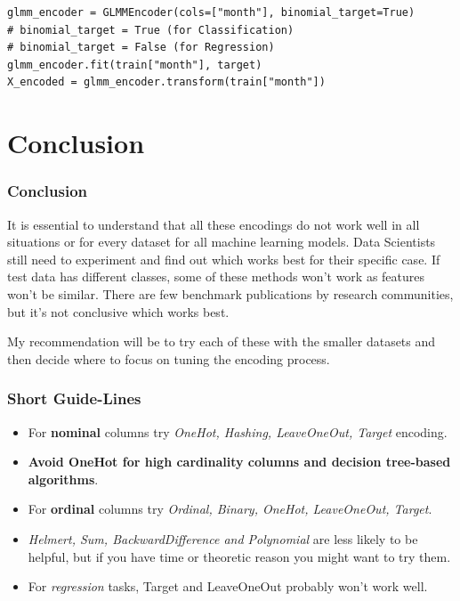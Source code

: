 \documentclass{beamer}
\begin{document}
    \begin{frame}[fragile]
        \begin{lstlisting}
glmm_encoder = GLMMEncoder(cols=["month"], binomial_target=True)
# binomial_target = True (for Classification)
# binomial_target = False (for Regression)
glmm_encoder.fit(train["month"], target)
X_encoded = glmm_encoder.transform(train["month"])
        \end{lstlisting}
    \end{frame}


    \section{Conclusion}
    \begin{frame}
        \frametitle{Conclusion}
        It is essential to understand that all these encodings do not work well in all situations
        or for every dataset for all machine learning models. Data Scientists still need to
        experiment and find out which works best for their specific case. If test data has
        different classes, some of these methods won't work as features won't be similar. There
        are few benchmark publications by research communities, but it's not conclusive which
        works best.

        My recommendation will be to try each of these with the smaller datasets and
        then decide where to focus on tuning the encoding process.
    \end{frame}

    \begin{frame}
        \frametitle{Short Guide-Lines}
        \begin{itemize}
            \item For \textbf{nominal} columns try \emph{OneHot, Hashing, LeaveOneOut, Target} encoding.
            \pause
            \item \textbf{Avoid OneHot for high cardinality columns and decision tree-based algorithms}.
            \pause
            \item For \textbf{ordinal} columns try \emph{Ordinal, Binary, OneHot, LeaveOneOut,
                Target}.
            \pause
            \item \emph{Helmert, Sum, BackwardDifference and Polynomial} are less likely to be
            helpful, but if you have time or theoretic reason you might want to try them.
            \pause
            \item For \emph{regression} tasks, Target and LeaveOneOut probably won't work well.
        \end{itemize}
    \end{frame}
\end{document}
